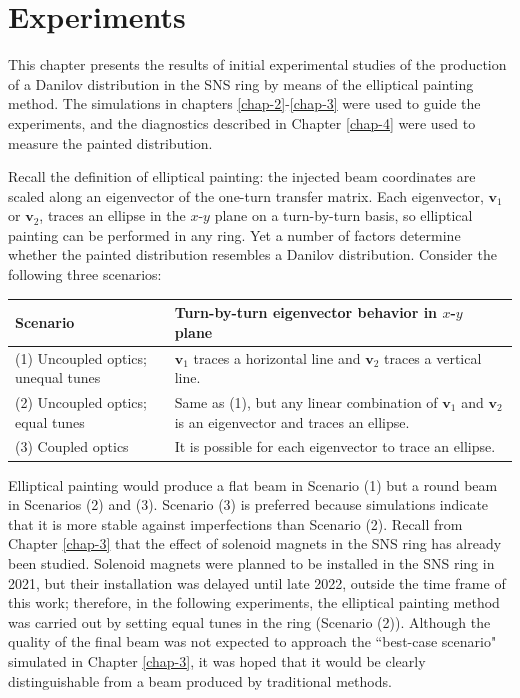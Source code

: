 \chapter{Experiments} \label{chap-5}

This chapter presents the results of initial experimental studies of the production of a Danilov distribution in the SNS ring by means of the elliptical painting method. The simulations in chapters \ref{chap-2}-\ref{chap-3} were used to guide the experiments, and the diagnostics described in Chapter \ref{chap-4} were used to measure the painted distribution.

Recall the definition of elliptical painting: the injected beam coordinates are scaled along an eigenvector of the one-turn transfer matrix. Each eigenvector, $\mathbf{v}_1$ or $\mathbf{v}_2$, traces an ellipse in the $x$-$y$ plane on a turn-by-turn basis, so elliptical painting can be performed in any ring. Yet a number of factors determine whether the painted distribution resembles a Danilov distribution. Consider the following three scenarios:

\begin{table}[h!]
    \centering
    \begin{tabularx}{1.0\textwidth} { 
        | >{\raggedright\arraybackslash}X 
        | >{\raggedright\arraybackslash}X | }
     \hline
     \textbf{Scenario} & \textbf{Turn-by-turn eigenvector behavior in $x$-$y$ plane} \\
     \hline
     (1) Uncoupled optics; unequal tunes & $\mathbf{v}_1$ traces a horizontal line and $\mathbf{v}_2$ traces a vertical line. \\
     \hline
     (2) Uncoupled optics; equal tunes & Same as (1), but any linear combination of $\mathbf{v}_1$ and $\mathbf{v}_2$ is an eigenvector and traces an ellipse. \\
     \hline
     (3) Coupled optics & It is possible for each eigenvector to trace an ellipse. \\
    \hline
    \end{tabularx}
    \label{tab:painting_scenarios}
\end{table}

Elliptical painting would produce a flat beam in Scenario (1) but a round beam in Scenarios (2) and (3). Scenario (3) is preferred because simulations indicate that it is more stable against imperfections than Scenario (2). Recall from Chapter \ref{chap-3} that the effect of solenoid magnets in the SNS ring has already been studied. Solenoid magnets were planned to be installed in the SNS ring in 2021, but their installation was delayed until late 2022, outside the time frame of this work; therefore, in the following experiments, the elliptical painting method was carried out by setting equal tunes in the ring (Scenario (2)). Although the quality of the final beam was not expected to approach the ``best-case scenario" simulated in Chapter \ref{chap-3}, it was hoped that it would be clearly distinguishable from a beam produced by traditional methods. 

